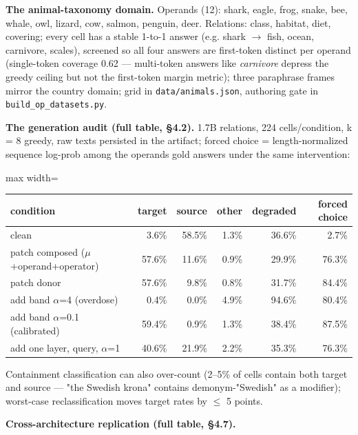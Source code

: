 \textbf{The animal-taxonomy domain.} Operands (12): shark, eagle, frog,
snake, bee, whale, owl, lizard, cow, salmon, penguin, deer. Relations:
class, habitat, diet, covering; every cell has a stable 1-to-1 answer
(e.g. shark \ensuremath{\to} fish, ocean, carnivore, scales), screened so all four
answers are first-token distinct per operand (single-token coverage 0.62
--- multi-token answers like \emph{carnivore} depress the greedy ceiling
but not the first-token margin metric); three paraphrase frames mirror
the country domain; grid in \texttt{data/animals.json}, authoring gate
in \texttt{build\_op\_datasets.py}.

\textbf{The generation audit (full table, \S{}4.2).} 1.7B relations, 224
cells/condition, k = 8 greedy, raw texts persisted in the artifact;
forced choice = length-normalized sequence log-prob among the
operand\textquotesingle s gold answers under the same intervention:

{
\begin{table}[H]
\centering\small
\setlength{\tabcolsep}{4pt}
\begin{adjustbox}{max width=\textwidth}
\begin{tabular}{lrrrrr}
\toprule
condition & target & source & other & degraded & forced choice \\
\midrule
clean & 3.6\% & 58.5\% & 1.3\% & 36.6\% & 2.7\% \\
patch composed (\ensuremath{\mu}+operand+operator) & 57.6\% & 11.6\% & 0.9\% & 29.9\% &
76.3\% \\
patch donor & 57.6\% & 9.8\% & 0.8\% & 31.7\% & 84.4\% \\
add band \ensuremath{\alpha}=4 (overdose) & 0.4\% & 0.0\% & 4.9\% & 94.6\% & 80.4\% \\
add band \ensuremath{\alpha}=0.1 (calibrated) & 59.4\% & 0.9\% & 1.3\% & 38.4\% &
87.5\% \\
add one layer, query, \ensuremath{\alpha}=1 & 40.6\% & 21.9\% & 2.2\% & 35.3\% & 76.3\% \\
\bottomrule
\end{tabular}
\end{adjustbox}
\end{table}
}

Containment classification can also over-count (2--5\% of cells contain
both target and source --- "the Swedish krona" contains
demonym-"Swedish" as a modifier); worst-case reclassification moves
target rates by \ensuremath{\leq} 5 points.

\textbf{Cross-architecture replication (full table, \S{}4.7).}

